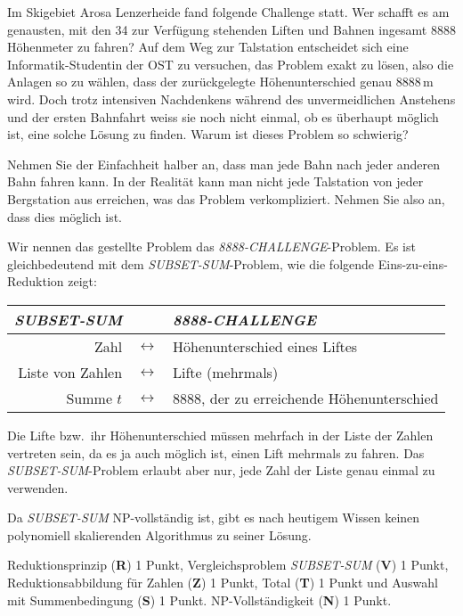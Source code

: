 Im Skigebiet Arosa Lenzerheide fand folgende Challenge statt.
Wer schafft es am genausten, mit den 34 zur Verfügung stehenden
Liften und Bahnen ingesamt 8888 Höhenmeter zu fahren?
Auf dem Weg zur Talstation entscheidet sich eine Informatik-Studentin
der OST zu versuchen, das Problem exakt zu lösen, also die Anlagen
so zu wählen, dass der zurückgelegte Höhenunterschied genau
$8888\,\text{m}$ wird.
Doch trotz intensiven Nachdenkens während des unvermeidlichen Anstehens und
der ersten Bahnfahrt weiss sie noch nicht einmal, ob es überhaupt möglich
ist, eine solche Lösung zu finden.
Warum ist dieses Problem so schwierig?


\begin{hinweis}
Nehmen Sie der Einfachheit halber an, dass man jede Bahn nach jeder
anderen Bahn fahren kann.
In der Realität kann man nicht jede Talstation von jeder Bergstation aus
erreichen, was das Problem verkompliziert.
Nehmen Sie also an, dass dies möglich ist.
\end{hinweis}

\begin{loesung}
Wir nennen das gestellte Problem das \textit{8888-CHALLENGE}-Problem.
Es ist gleichbedeutend mit dem \textit{SUBSET-SUM}-Problem, wie die folgende
Eins-zu-eins-Reduktion zeigt:
\begin{center}
\begin{tabular}{rcl}	
\textit{SUBSET-SUM}&&\textit{8888-CHALLENGE}\\
\hline
Zahl             & $\leftrightarrow$ &Höhenunterschied eines Liftes\\
Liste von Zahlen & $\leftrightarrow$ &Lifte (mehrmals)\\
Summe $t$        & $\leftrightarrow$ &$8888$, der zu erreichende Höhenunterschied
\end{tabular}
\end{center}
Die Lifte bzw.~ihr Höhenunterschied müssen mehrfach in der Liste der
Zahlen vertreten sein, da es ja auch möglich ist, einen Lift mehrmals
zu fahren.
Das \textit{SUBSET-SUM}-Problem erlaubt aber nur, jede Zahl der Liste
genau einmal zu verwenden.

Da \textit{SUBSET-SUM} NP-vollständig ist, gibt es nach heutigem Wissen
keinen polynomiell skalierenden Algorithmus zu seiner Lösung.
\end{loesung}

\begin{bewertung}
Reduktionsprinzip ({\bf R}) 1 Punkt,
Vergleichsproblem \textit{SUBSET-SUM} ({\bf V}) 1 Punkt,
Reduktionsabbildung für Zahlen ({\bf Z}) 1 Punkt,
Total ({\bf T}) 1 Punkt und
Auswahl mit Summenbedingung ({\bf S}) 1 Punkt.
NP-Vollständigkeit ({\bf N}) 1 Punkt.
\end{bewertung}
